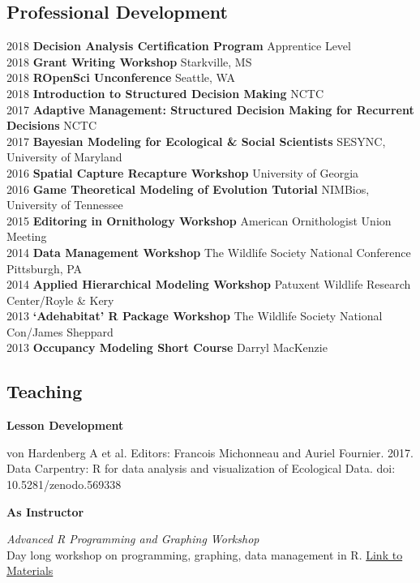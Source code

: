 \documentclass[]{article}
\begin{document}
\subsection{Professional Development}\label{professional-development}

2018 \textbf{Decision Analysis Certification Program} Apprentice Level\\
2018 \textbf{Grant Writing Workshop} Starkville, MS\\
2018 \textbf{ROpenSci Unconference} Seattle, WA\\
2018 \textbf{Introduction to Structured Decision Making} NCTC\\
2017 \textbf{Adaptive Management: Structured Decision Making for
Recurrent Decisions} NCTC\\
2017 \textbf{Bayesian Modeling for Ecological \& Social Scientists}
SESYNC, University of Maryland\\
2016 \textbf{Spatial Capture Recapture Workshop} University of Georgia\\
2016 \textbf{Game Theoretical Modeling of Evolution Tutorial} NIMBios,
University of Tennessee\\
2015 \textbf{Editoring in Ornithology Workshop} American Ornithologist
Union Meeting\\
2014 \textbf{Data Management Workshop} The Wildlife Society National
Conference Pittsburgh, PA\\
2014 \textbf{Applied Hierarchical Modeling Workshop} Patuxent Wildlife
Research Center/Royle \& Kery\\
2013 \textbf{`Adehabitat' R Package Workshop} The Wildlife Society
National Con/James Sheppard\\
2013 \textbf{Occupancy Modeling Short Course} Darryl MacKenzie

\subsection{Teaching}\label{teaching}

\textbf{Lesson Development}

von Hardenberg A et al. Editors: Francois Michonneau and Auriel
Fournier. 2017. Data Carpentry: R for data analysis and visualization of
Ecological Data. doi: 10.5281/zenodo.569338

\textbf{As Instructor}

\emph{Advanced R Programming and Graphing Workshop}\\
Day long workshop on programming, graphing, data management in R.
\href{https://github.com/aurielfournier/AOSSCO17}{Link to Materials}
\end{document}
